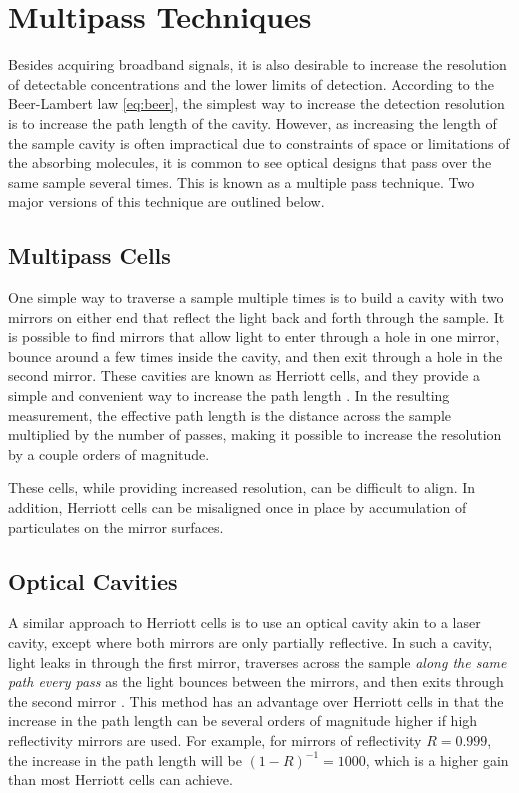 \section{Multipass Techniques}\label{sec:multipass}

Besides acquiring broadband signals, it is also desirable to increase the
resolution of detectable concentrations and the lower limits of detection.
According to the Beer-Lambert law \eqref{eq:beer}, the simplest way to increase
the detection resolution is to increase the path length of the cavity. However,
as increasing the length of the sample cavity is often impractical due to
constraints of space or limitations of the absorbing molecules, it is common to
see optical designs that pass over the same sample several times. This is known
as a multiple pass technique. Two major versions of this technique are outlined
below.



\subsection{Multipass Cells}\label{subsec:herriott}

One simple way to traverse a sample multiple times is to build a cavity with
two mirrors on either end that reflect the light back and forth through the
sample. It is possible to find mirrors that allow light to enter through a hole
in one mirror, bounce around a few times inside the cavity, and then exit
through a hole in the second mirror. These cavities are known as Herriott
cells, and they provide a simple and convenient way to increase the path
length \cite{Engel:2007va}. In the resulting measurement, the effective path
length is the distance across the sample multiplied by the number of passes,
making it possible to increase the resolution by a couple orders of magnitude.

These cells, while providing increased resolution, can be difficult to align.
In addition, Herriott cells can be misaligned once in place by accumulation of
particulates on the mirror surfaces.



\subsection{Optical Cavities}\label{subsec:cavity}

A similar approach to  Herriott cells is to use an optical cavity akin to a
laser cavity, except where both mirrors are only partially reflective. In such
a cavity, light leaks in through the first mirror, traverses across the sample
\emph{along the same path every pass} as the light bounces between the mirrors,
and then exits through the second mirror \cite{Berden:2009wk}. This method has an advantage over
Herriott cells in that the increase in the path length can be several orders of
magnitude higher if high reflectivity mirrors are used. For example, for
mirrors of reflectivity $R=0.999$, the increase in the path length will be
$(1-R)^{-1} = 1000$, which is a higher gain than most Herriott cells can
achieve.

